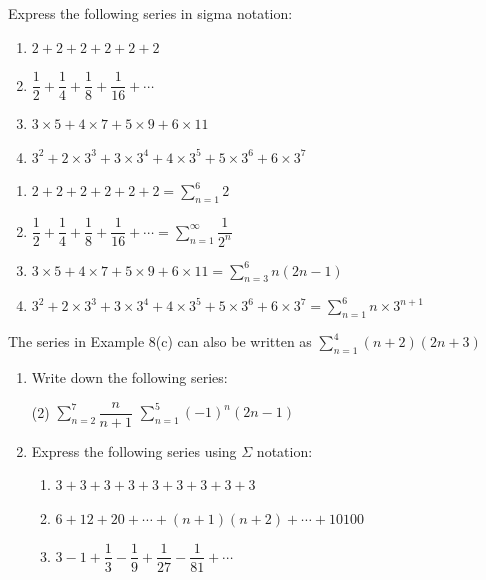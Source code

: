 \documentclass{report}
\begin{document}
\begin{question}
    Express the following series in sigma notation:
    \vspace{-1em}
    \begin{enumerate}[label=(\alph*)]
        \item $2+2+2+2+2+2$
        \item $\dfrac{1}{2}+\dfrac{1}{4}+\dfrac{1}{8}+\dfrac{1}{16}+\cdots$
        \item $3 \times 5+4 \times 7+5 \times 9+6 \times 11$
        \item $3^{2}+2 \times 3^{3}+3 \times 3^{4}+4 \times 3^{5}+5 \times 3^{6}+6 \times 3^{7}$
    \end{enumerate}

    \sol{}
    \begin{enumerate}[label=(\alph*)]
        \item $2+2+2+2+2+2=\displaystyle\sum_{n=1}^{6} 2$
        \item $\dfrac{1}{2}+\dfrac{1}{4}+\dfrac{1}{8}+\dfrac{1}{16}+\cdots=\displaystyle\sum_{n=1}^{\infty} \dfrac{1}{2^{n}}$
        \item $3 \times 5+4 \times 7+5 \times 9+6 \times 11=\displaystyle\sum_{n=3}^{6} n(2 n-1)$
        \item $3^{2}+2 \times 3^{3}+3 \times 3^{4}+4 \times 3^{5}+5 \times 3^{6}+6 \times 3^{7}=\displaystyle\sum_{n=1}^{6} n \times 3^{n+1}$
    \end{enumerate}
\end{question}
\begin{warn}[Note:]
        The series in Example 8(c) can also be written as $\displaystyle\sum_{n=1}^4(n+2)(2 n+3)$
\end{warn}


\begin{enumerate}
    \item Write down the following series:
    \begin{tasks}[label=(\alph*)](2)
        \task $\displaystyle\sum_{n=2}^{7} \dfrac{n}{n+1}$
        \task $\displaystyle\sum_{n=1}^{5}(-1)^{n}(2 n-1)$
    \end{tasks}
    
    \item Express the following series using $\Sigma$ notation:
    \begin{enumerate}[label=(\alph*)]
        \item $3+3+3+3+3+3+3+3+3$
        \item $6+12+20+\cdots+(n+1)(n+2)+\cdots+10100$
        \item $3-1+\dfrac{1}{3}-\dfrac{1}{9}+\dfrac{1}{27}-\dfrac{1}{81}+\cdots$
    \end{enumerate}
\end{enumerate}
\end{document}
